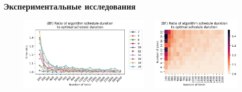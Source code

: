 \begin{frame}
    \frametitle{Экспериментальные исследования}
    \begin{figure}
        \begin{columns}
            \begin{column}{0.5\textwidth}
                \includegraphics[width=\textwidth]{imgs/experiments/BF/full_analysis/BF/gr_amalgamated.jpg}
            \end{column}
            \begin{column}{0.5\textwidth}
                \includegraphics[width=\textwidth]{imgs/experiments/BF/full_analysis/BF/tr_heatmap.jpg}
            \end{column}
        \end{columns}
    \end{figure}
\end{frame}

